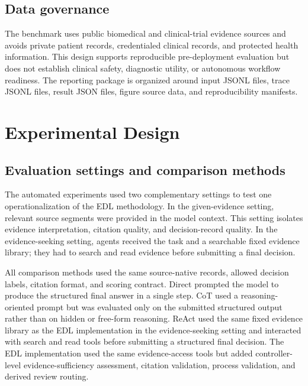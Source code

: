 \documentclass[11pt,a4paper]{article}
\begin{document}
\subsection{Data governance}

The benchmark uses public biomedical and clinical-trial evidence sources and avoids private patient records, credentialed clinical records, and protected health information. This design supports reproducible pre-deployment evaluation but does not establish clinical safety, diagnostic utility, or autonomous workflow readiness. The reporting package is organized around input JSONL files, trace JSONL files, result JSON files, figure source data, and reproducibility manifests.

\section{Experimental Design}

\subsection{Evaluation settings and comparison methods}

The automated experiments used two complementary settings to test one operationalization of the EDL methodology. In the given-evidence setting, relevant source segments were provided in the model context. This setting isolates evidence interpretation, citation quality, and decision-record quality. In the evidence-seeking setting, agents received the task and a searchable fixed evidence library; they had to search and read evidence before submitting a final decision.

All comparison methods used the same source-native records, allowed decision labels, citation format, and scoring contract. Direct prompted the model to produce the structured final answer in a single step. CoT used a reasoning-oriented prompt but was evaluated only on the submitted structured output rather than on hidden or free-form reasoning. ReAct used the same fixed evidence library as the EDL implementation in the evidence-seeking setting and interacted with search and read tools before submitting a structured final decision. The EDL implementation used the same evidence-access tools but added controller-level evidence-sufficiency assessment, citation validation, process validation, and derived review routing.
\end{document}
